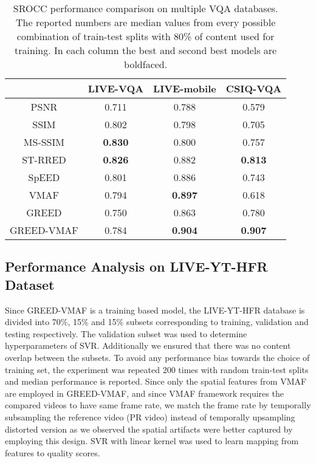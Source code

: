 \documentclass[conference]{IEEEtran}
\begin{document}
\begin{table}[t]
\caption{SROCC performance comparison on multiple VQA databases. The reported numbers are median values from every possible combination of train-test splits with 80\% of content used for training. In each column the best and second best models are boldfaced. }
    \label{Table:VQA_database}
    \centering
    \footnotesize
    \begin{tabular}{|c||c|c|c|}
        \hline
        ~    & LIVE-VQA  & LIVE-mobile & CSIQ-VQA \\ \hline \hline 
        PSNR & 0.711 & 0.788 & 0.579 \\ 
        SSIM \cite{wang2004image} & 0.802 & 0.798 & 0.705 \\ 
        MS-SSIM \cite{wang2003multiscale} & \textbf{0.830} & 0.800 & 0.757 \\
        ST-RRED \cite{soundararajan2012video} & \textbf{0.826} & 0.882 & \textbf{0.813} \\ 
        SpEED \cite{bampis2017speed} & 0.801 & 0.886 & 0.743 \\ 
        VMAF \cite{VMAF2016}& 0.794 & \textbf{0.897} & 0.618 \\ \hline
        GREED & 0.750 & 0.863 & 0.780 \\
        GREED-VMAF & 0.784 & \textbf{0.904} & \textbf{0.907} \\
        \hline
    \end{tabular}
\end{table}

\subsection{Performance Analysis on LIVE-YT-HFR Dataset}
Since GREED-VMAF is a training based model, the LIVE-YT-HFR database is divided into 70\%, 15\% and 15\% subsets corresponding to training, validation and testing respectively. The validation subset was used to determine hyperparameters of SVR. Additionally we ensured that there was no content overlap between the subsets. To avoid any performance bias towards the choice of training set, the experiment was repeated 200 times with random train-test splits and median performance is reported. Since only the spatial features from VMAF are employed in GREED-VMAF, and since VMAF framework requires the compared videos to have same frame rate, we match the frame rate by temporally subsampling the reference video (PR video) instead of temporally upsampling distorted version as we observed the spatial artifacts were better captured by employing this design. SVR with linear kernel was used to learn mapping from features to quality scores.
\end{document}
